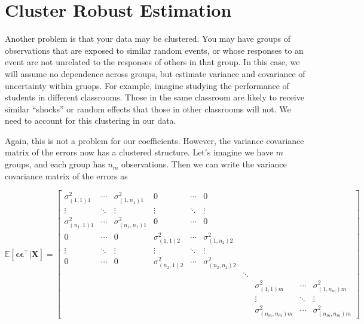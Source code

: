 \documentclass[]{article}
\begin{document}
\hypertarget{cluster-robust-estimation}{%
\section{Cluster Robust Estimation}\label{cluster-robust-estimation}}

Another problem is that your data may be clustered. You may have groups
of observations that are exposed to similar random events, or whose
responses to an event are not unrelated to the responses of others in
that group. In this case, we will assume no dependence across groups,
but estimate variance and covariance of uncertainty within gruops. For
example, imagine studying the performance of students in different
classrooms. Those in the same classroom are likely to receive similar
``shocks'' or random effects that those in other classrooms will not. We
need to account for this clustering in our data.

Again, this is not a problem for our coefficients. However, the variance
covariance matrix of the errors now has a clustered structure. Let's
imagine we have \(m\) groups, and each group has \(n_m\) observations.
Then we can write the variance covariance matrix of the errors as

\[\mathbb{E}[\bm{\epsilon}\bm{\epsilon}^\top |\mathbf{X}] = \begin{bmatrix}
\sigma_{(1,1)1}^2 & \cdots & \sigma_{(1,n_1)1}^2 & 0 & \cdots & 0 & & & & \\
\vdots &  \ddots & \vdots & \vdots & \ddots & \vdots & & & & \\
\sigma_{(n_1,1)1}^2& \cdots & \sigma_{(n_1,n_1)1}^2 & 0 & \cdots & 0 & & & & \\
0 & \cdots & 0 & \sigma_{(1,1)2}^2 & \cdots & \sigma_{(1,n_2)2}^2 & & & & \\
\vdots & \ddots & \vdots & \vdots &  \ddots & \vdots & & & & \\
0 & \cdots & 0 & \sigma_{(n_2,1)2}^2& \cdots & \sigma_{(n_2,n_2)2}^2 & & & & \\
 & & & & & & \ddots & & & \\
 & & & & & & & \sigma_{(1,1)m}^2 & \cdots & \sigma_{(1,n_m)m}^2 \\
 & & & & & & & \vdots & \ddots & \vdots\\
 & & & & & & & \sigma_{(n_m,n_m)m}^2 & \cdots & \sigma_{(n_m,n_m)m}^2
\end{bmatrix}\]
\end{document}
